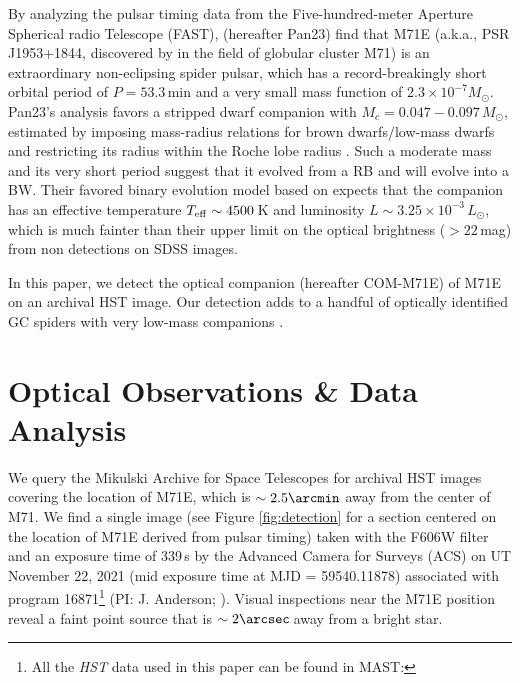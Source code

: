 \documentclass[twocolumn]{aastex631}
\begin{document}
By analyzing the pulsar timing data from the Five-hundred-meter Aperture Spherical radio Telescope (FAST), \citet{pan_binary_2023} (hereafter Pan23) find that M71E (a.k.a., PSR J1953+1844, discovered by \citealt{Han2021} in the field of globular cluster M71) is an extraordinary non-eclipsing spider pulsar, which has a record-breakingly short orbital period of $P=53.3$\,min and a very small mass function of $2.3\times10^{-7}M_\odot$. Pan23's analysis favors a stripped dwarf companion with $M_c = 0.047 - 0.097\,M_\odot$, estimated by imposing mass-radius relations for brown dwarfs/low-mass dwarfs \citep{Burrows1993} and restricting its radius within the Roche lobe radius \citep{Eggleton1983}. Such a moderate mass and its very short period suggest that it evolved from a RB and will evolve into a BW. Their favored binary evolution model based on \citet{Chen2013} expects that the companion has an effective temperature $T_{\rm eff}\sim4500$\,K and luminosity $L\sim3.25\times10^{-3}\,L_\odot$, which is much fainter than their upper limit on the optical brightness ($>22$\,mag) from non detections on SDSS images. 

In this paper, we detect the optical companion (hereafter COM-M71E) of M71E on an archival HST image. Our detection adds to a handful of optically identified GC spiders with very low-mass companions \citep[e.g.,][]{COM-M5, COM-M71}. 


\section{Optical Observations \& Data Analysis} \label{sec:data}

We query the Mikulski Archive for Space Telescopes for archival HST images covering the location of M71E, which is $\sim 2.5\arcmin$ away from the center of M71. We find a single image (see Figure \ref{fig:detection} for a section centered on the location of M71E derived from pulsar timing) taken with the F606W filter and an exposure time of 339\,s by the Advanced Camera for Surveys (ACS) on UT November 22, 2021 (mid exposure time at MJD = 59540.11878) associated with program 16871\footnote{All the {\it HST} data used in this paper can be found in MAST: } (PI: J. Anderson; \citealt{2021hst..prop16871A}). Visual inspections near the M71E position reveal a faint point source that is $\sim 2\arcsec$\,away from a bright star. 
\end{document}
